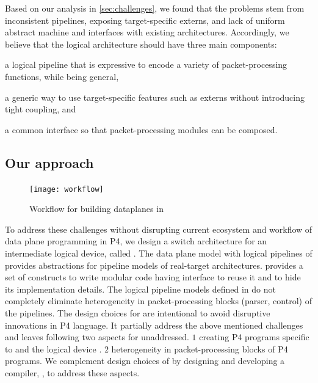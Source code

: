 \documentclass[letterpaper,twocolumn,10pt]{article}
\begin{document}
Based on our analysis in \cref{sec:challenges}, we found that the
problems stem from inconsistent pipelines, exposing target-specific
externs, and lack of uniform abstract machine and interfaces with
existing architectures. Accordingly, we believe that the logical
architecture should have three main components:
\begin{enumerate*}[label=(\roman*)]
  \item a logical pipeline that is expressive to encode a variety of
    packet-processing functions, while being general,
  \item a generic way to use target-specific features such as externs
    without introducing tight coupling, and
  \item a common interface so that packet-processing modules can be
    composed.
\end{enumerate*}


\subsection{Our approach}
\label{sec:approach}
\begin{figure}[tbh]
  \centering
  \texttt{[image: workflow]}
  \caption{Workflow for building dataplanes in \ulang}
  \label{fig:workflow}
\end{figure}

To address these challenges without disrupting current ecosystem and
workflow of data plane programming in P4, we design a switch
architecture \uarch for an intermediate logical device, called \ucomp.
The data plane model with logical pipelines of \ucomp provides
abstractions for pipeline models of real-target architectures.  \uarch
provides a set of constructs to write modular code having interface to
reuse it and to hide its implementation details.  The logical pipeline
models defined in \uarch do not completely eliminate heterogeneity in
packet-processing blocks (parser, control) of the pipelines.
The design choices for \uarch are intentional to avoid disruptive
innovations in P4 language.  It partially address the above mentioned
challenges and leaves following two aspects for unaddressed.  $1$
creating P4 programs specific to \uarch and the logical device \ucomp.
$2$ heterogeneity in packet-processing blocks of P4 programs.  We
complement design choices of \uarch by designing and developing a
compiler, \ucomp, to address these aspects.
\end{document}
